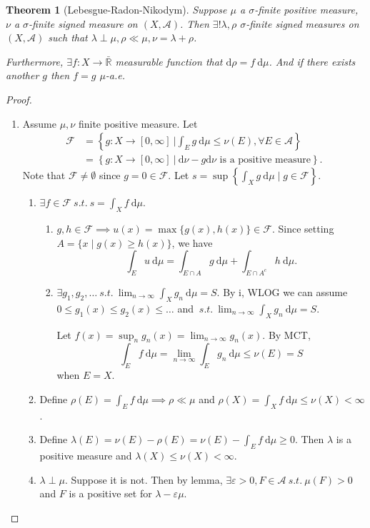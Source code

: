 \documentclass{report}
\newcommand{\R}{\mathbb{R}}
\newcommand{\st}{\ s.t.\ }
\newcommand{\cA}{\mathcal{A}}
\newcommand{\cF}{\mathcal{F}}
\newcommand{\df}{\ \mathrm{d}}
\newcommand{\ndf}{\mathrm{d}}
\newtheorem{theorem}{Theorem}[chapter]
\theoremstyle{definition}
\theoremstyle{remark}
\begin{document}
\begin{theorem}[Lebesgue-Radon-Nikodym] 
	Suppose $\mu$ a $\sigma$-finite positive measure, $\nu$ a $\sigma$-finite signed measure on $(X, \cA)$. Then $\exists! \lambda, \rho$ $\sigma$-finite signed measures on $(X, \cA)$ such that $\lambda \perp \mu, \rho \ll \mu, \nu = \lambda + \rho$.

	Furthermore, $\exists f: X \to \bar{\R}$ measurable function that $\ndf \rho = f\df\mu$. And if there exists another $g$ then $f = g$ $\mu$-a.e. 
\end{theorem}
\begin{proof}
	\begin{enumerate}
		\item Assume $\mu, \nu$ finite positive measure.
		Let \begin{align*}
			\cF & = \left\{g: X \to [0, \infty]\ \biggr\rvert \int_E g \df \mu \leq \nu(E), \forall E \in \cA \right\} \\
			& = \left\{g: X \to [0, \infty]\ \biggr\rvert\ \ndf\nu - g\ndf\nu \text{ is a positive measure}\right\}.
		\end{align*}
		Note that $\cF \neq \emptyset$ since $g = 0 \in \cF$. Let $s = \sup \left\{\int_X g \df \mu \mid g \in \cF\right\}$.
		\begin{enumerate}
			\item $\exists f \in \cF \st s = \int_X f \df \mu$. \begin{enumerate}
				\item $g, h \in \cF \implies u(x) = \max\{g(x), h(x)\} \in \cF$.
				Since setting $A = \{x \mid g(x) \geq h(x)\}$, we have \[
					\int_E u \df \mu = \int_{E \cap A} g \df \mu + \int_{E \cap A^c} h \df \mu.	
				\]
				\item $\exists g_1, g_2, \ldots \st \lim_{n \to \infty} \int_X g_n \df \mu = S$.
				By i, WLOG we can assume $0 \leq g_1(x) \leq g_2(x) \leq \ldots$ and $\st \lim_{n \to \infty} \int_X g_n \df \mu = S$.

				Let $f(x) = \sup_n g_n(x) = \lim_{n \to \infty} g_n(x)$. By MCT, \[\int_E f \df \mu = \lim_{n \to \infty} \int_E g_n \df \mu \leq \nu(E) = S\] when $E = X$.
			\end{enumerate}

			\item Define $\rho(E) = \int_E f \df \mu \implies \rho \ll \mu$ and $\rho(X) = \int_X f \df \mu \leq \nu(X) < \infty$.
			\item Define $\lambda(E) = \nu(E) - \rho(E) = \nu(E) - \int_E f \df \mu \geq 0$. Then $\lambda$ is a positive measure and $\lambda(X) \leq \nu(X) < \infty$.
			\item $\lambda \perp \mu$. Suppose it is not. Then by lemma, $\exists \varepsilon > 0, F \in \cA \st \mu(F) > 0$ and $F$ is a positive set for $\lambda - \varepsilon \mu$.
			

\end{enumerate}
\end{enumerate}
\end{proof}
\end{document}
